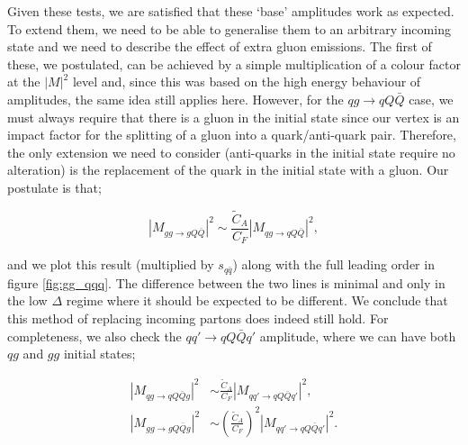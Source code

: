 Given these tests, we are satisfied that these `base' amplitudes work as expected. To extend them, we need to be able to generalise them to an arbitrary incoming state and we need to describe the effect of extra gluon emissions. The first of these, we postulated, can be achieved by a simple multiplication of a colour factor at the $|M|^2$ level and, since this was based on the high energy behaviour of amplitudes, the same idea still applies here. However, for the $qg \to qQ\bar{Q}$ case, we must always require that there is a gluon in the initial state since our vertex is an impact factor for the splitting of a gluon into a quark/anti-quark pair. Therefore, the only extension we need to consider (anti-quarks in the initial state require no alteration) is the replacement of the quark in the initial state with a gluon. Our postulate is that;

\begin{equation}
|M_{gg \to gQ\bar{Q}}|^2 \sim \frac{\tilde{C}_A}{C_F} |M_{qg \to qQ\bar{Q}}|^2,
\end{equation}

and we plot this result (multiplied by $s_{q\bar{q}}$) along with the full leading order in figure \ref{fig:gg_qqq}. The difference between the two lines is minimal and only in the low $\Delta$ regime where it should be expected to be different. We conclude that this method of replacing incoming partons does indeed still hold. For completeness, we also check the $qq' \to qQ\bar{Q}q'$ amplitude, where we can have both $qg$ and $gg$ initial states;

\begin{equation}
\begin{split}
|M_{qg \to qQ\bar{Q}g}|^2 &\sim \frac{\tilde{C}_A}{C_F} |M_{qq' \to qQ\bar{Q}q'}|^2, \\
|M_{gg \to gQ\bar{Q}g}|^2 &\sim \left(\frac{\tilde{C}_A}{C_F}\right)^2 |M_{qq' \to qQ\bar{Q}q'}|^2.
\end{split}
\end{equation}

